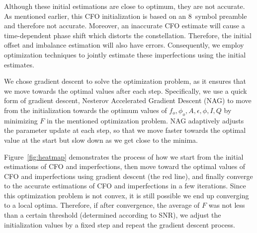 Although these initial estimations are close to optimum,
they are not accurate. 
%
As mentioned earlier, this CFO initialization is based on an 8~symbol preamble and therefore not accurate. 
%
Moreover, an inaccurate CFO estimate will cause a time-dependent phase
shift which distorts the \iq constellation. 
%
Therefore, the initial \iq offset
and imbalance estimation will also have errors. 
%
Consequently, we employ
optimization techniques to jointly estimate these imperfections using the initial estimates. 
 
%
%
We chose gradient descent to solve the optimization problem, as it ensures that we move towards the optimal values after each step. 
%
Specifically, we use a quick form of gradient descent, Nesterov Accelerated Gradient Descent (NAG) to move from the initialization towards the optimum values
of $f_o,\phi_o,A,\epsilon,\phi,I,Q$ by minimizing $F$ in the mentioned
optimization problem. 
%
NAG adaptively adjusts the parameter update at each step, so that we move faster towards the optimal value at the start but slow down as we get close to the minima.

Figure~\ref{fig:heatmap} demonstrates the process of how we start from the initial estimations of CFO and \iq imperfections, then move toward the optimal values of CFO and \iq imperfections using gradient descent (the red line), and finally converge to the accurate estimations of CFO and \iq imperfections in a few iterations. Since this optimization problem is not convex, it is still possible we end up converging to a local optima. Therefore, if after convergence, the average of $F$ was not less than a certain threshold (determined according to SNR), we adjust the initialization values by a fixed step and repeat the gradient descent process. 

